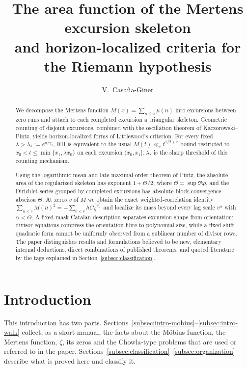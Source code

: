 \documentclass[11pt,reqno]{amsart}
\title[The Mertens excursion skeleton]{The area function of the Mertens excursion skeleton\\
and horizon-localized criteria for the Riemann hypothesis}
\author{V.~Casa\~na-Giner}
\date{}
\numberwithin{equation}{section}
\theoremstyle{plain}
\theoremstyle{definition}
\theoremstyle{remark}
\newcommand{\eps}{\varepsilon}
\begin{document}
\begin{abstract}
We decompose the Mertens function $M(x)=\sum_{n\le x}\mu(n)$ into excursions
between zero runs and attach to each completed excursion a triangular
skeleton.  Geometric counting of disjoint excursions, combined with the
oscillation theorem of Kaczorowski--Pintz, yields horizon-localized forms of
Littlewood's criterion.  For every fixed
$\lambda>\lambda_*:=e^{\pi/\gamma_1}$, RH is equivalent to the usual
$M(t)\ll_\eps t^{1/2+\eps}$ bound restricted to
$x_0<t\le\min\{x_1,\lambda x_0\}$ on each excursion $(x_0,x_1]$;
$\lambda_*$ is the sharp threshold of this counting mechanism.

Using the logarithmic mean and late maximal-order theorem of Pintz, the
absolute area of the regularized skeleton has exponent
$1+\Theta/2$, where $\Theta=\sup\Re\rho$, and the Dirichlet series grouped by
completed excursions has absolute block-convergence abscissa $\Theta$.
At zeros $v$ of $M$ we obtain the exact weighted-correlation identity
$\sum_{n<v}M(n)^2=-\sum_{h<v}hC_h^{[v]}$ and localize its mass beyond every
lag scale $v^\alpha$ with $\alpha<\Theta$.  A fixed-mask Catalan description
separates excursion shape from orientation; divisor equations compress the
orientation fibre to polynomial size, while a fixed-shift quadratic form
cannot be uniformly observed from a sublinear number of divisor rows.  The
paper distinguishes results and formulations believed to be new, elementary
internal deductions, direct combinations of published theorems, and quoted
literature by the tags explained in Section~\ref{subsec:classification}.
\end{abstract}

\maketitle

\tableofcontents

\section{Introduction}
\label{sec:introduction}

This introduction has two parts. Sections~\ref{subsec:intro-mobius}--\ref{subsec:intro-walk}
collect, as a short manual, the facts about the Möbius function, the Mertens
function, $\zeta$, its zeros and the Chowla-type problems that are used or
referred to in the paper. Sections~\ref{subsec:classification}--\ref{subsec:organization}
describe what is proved here and classify it.
\end{document}
